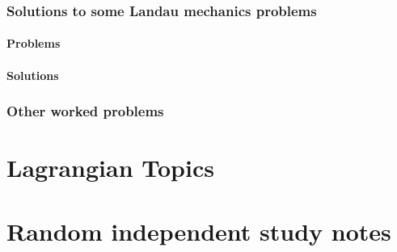       \section{Solutions to some Landau mechanics problems}
         \subsection{Problems}
            
         \subsection{Solutions}
            \shipoutAnswer
      \section{Other worked problems}
         
            \shipoutAnswer
   
\part{Lagrangian Topics}
   
   
   
   
   
   

\part{Random independent study notes}
   
   
   
   
   
   
   
   
   
   
   
   
   

